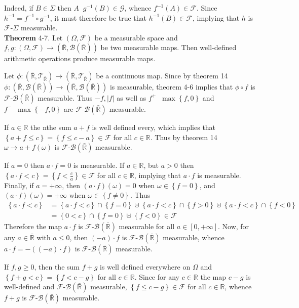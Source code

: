 \documentclass[a4paper]{article}
\newcommand{\obj}[1]{\left\{ #1 \right \}}
\newcommand{\clo}[1]{\left [ #1 \right ]}
\newcommand{\brac}[1]{\left ( #1 \right )}
\newcommand{\abs}[1]{\left | #1 \right |}
\newcommand{\Rbar}{{\bar{\mathbb{R}}}}
\newcommand{\Real}{\mathbb{R}}
\newcommand{\Zinf}{\clo{ 0, +\infty }}
\newcommand{\Tcal}{\mathcal{T}}
\newcommand{\Fcal}{\mathcal{F}}
\newcommand{\borel}[1]{\mathcal{B}\brac{#1}}
\newcommand{\defn}{\mathop{\overset{\Delta}{=}}\nolimits}
\begin{document}
Indeed, if $B\in \Sigma$ then $A\defn g^{-1}\brac{B}\in \mathcal{G}$, whence $f^{-1}\brac{A}\in \Fcal$. Since $h^{-1}=f^{-1}\circ g^{-1}$, it must therefore be true that $h^{-1}\brac{B}\in \Fcal$, implying that $h$ is $\Fcal$-$\Sigma$ measurable.\\

\label{thm:sum_prod_meas} \noindent \textbf{Theorem} 4-7.
Let $\brac{\Omega, \Fcal}$ be a measurable space and $f,g:\brac{\Omega, \Fcal}\to\brac{\Rbar,\borel{\Rbar}}$ be two measurable maps. Then well-defined arithmetic operations produce measurable maps.

Let $\phi:\brac{\Rbar,\Tcal_\Rbar}\to\brac{\Rbar,\Tcal_\Rbar}$ be a continuous map. Since by theorem 14 $\phi:\brac{\Rbar,\borel{\Rbar}}\to\brac{\Rbar,\borel{\Rbar}}$ is measurable, theorem 4-6 implies that $\phi\circ f$ is $\Fcal$-$\borel{\Rbar}$ measurable. Thus $-f, \abs{f}$ as well as $f^+\defn \max\obj{f,0}$ and $f^-\defn \max\obj{-f,0}$ are $\Fcal$-$\borel{\Rbar}$ measurable.

If $a\in \Real$ the nthe sum $a+f$ is well defined every, which implies that $\obj{a+f\leq c} = \obj{f\leq c-a}\in \Fcal$ for all $c\in \Real$. Thus by theorem 14 $\omega\to a+f\brac{\omega}$ is $\Fcal$-$\borel{\Rbar}$ measurable.

If $a=0$ then $a\cdot f = 0$ is measurable. If $a\in\Real$, but $a>0$ then $\obj{a \cdot f < c}=\obj{f < \frac{c}{a}}\in \Fcal$ for all $c\in \Real$, implying that $a\cdot f$ is measurable. Finally, if $a=+\infty$, then $\brac{a\cdot f}\brac{\omega} = 0$ when $\omega\in\obj{f=0}$, and $\brac{a\cdot f}\brac{\omega} = \pm\infty$ when $\omega\in\obj{f\neq0}$. Thus \begin{align*}\obj{a\cdot f < c}&=\obj{a\cdot f < c}\cap \obj{f=0}\uplus \obj{a\cdot f < c}\cap\obj{f>0}\uplus \obj{a\cdot f < c}\cap\obj{f<0}\\&=\obj{0<c}\cap \obj{f=0}\uplus \obj{f<0}\in \Fcal\end{align*} Therefore the map $a\cdot f$ is $\Fcal$-$\borel{\Rbar}$ measurable for all $a\in \Zinf$. Now, for any $a\in \Rbar$ with $a\leq 0$, then $\brac{-a}\cdot f$ is $\Fcal$-$\borel{\Rbar}$ measurable, whence $a\cdot f = -\brac{\brac{-a}\cdot f}$ is $\Fcal$-$\borel{\Rbar}$ measurable.

If $f,g\geq 0$, then the sum $f+g$ is well defined everywhere on $\Omega$ and $\obj{f+g<c}=\obj{f<c-g}$ for all $c\in\Real$. Since for any $c\in\Real$ the map $c-g$ is well-defined and $\Fcal$-$\borel{\Rbar}$ measurable, $\obj{f\leq c-g}\in\Fcal$ for all $c\in\Real$, whence $f+g$ is $\Fcal$-$\borel{\Rbar}$ measurable.
\end{document}
